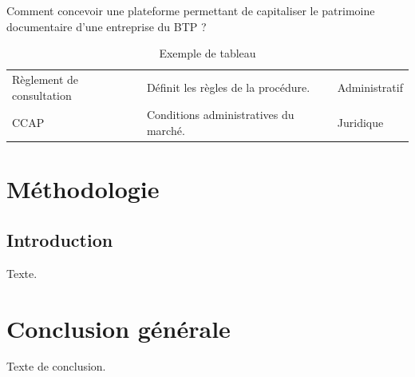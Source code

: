 \documentclass[12pt,a4paper,oneside,openany]{report}
\begin{document}
\begin{btpquote}
Comment concevoir une plateforme permettant de capitaliser le patrimoine
documentaire d'une entreprise du BTP ?
\end{btpquote}

\begin{table}[htbp]
\centering\small
\caption{Exemple de tableau}
\begin{tabularx}{\linewidth}{@{}L{3cm} Y C{2cm}@{}}
\toprule
{}
 &  &  \\
\midrule
Règlement de consultation & Définit les règles de la procédure. & Administratif \\
CCAP & Conditions administratives du marché. & Juridique \\
\bottomrule
\end{tabularx}
\end{table}

\btpEndMark

\chapter{Méthodologie}
\section{Introduction}
Texte.

\chapter*{Conclusion générale}
Texte de conclusion.
\end{document}
